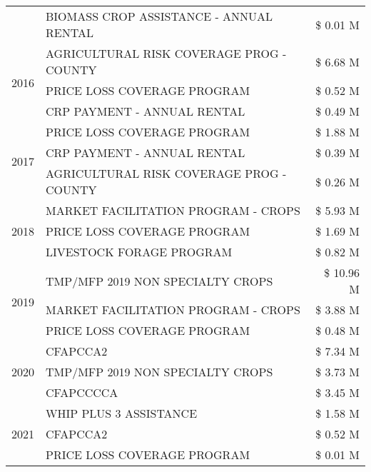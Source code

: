 \begin{tabular}{llr}
 & BIOMASS CROP ASSISTANCE - ANNUAL RENTAL & \$ 0.01 M \\
\cline{1-3}
\multirow[t]{3}{*}{2016} & AGRICULTURAL RISK COVERAGE PROG - COUNTY & \$ 6.68 M \\
 & PRICE LOSS COVERAGE PROGRAM & \$ 0.52 M \\
 & CRP PAYMENT - ANNUAL RENTAL & \$ 0.49 M \\
\cline{1-3}
\multirow[t]{3}{*}{2017} & PRICE LOSS COVERAGE PROGRAM & \$ 1.88 M \\
 & CRP PAYMENT - ANNUAL RENTAL & \$ 0.39 M \\
 & AGRICULTURAL RISK COVERAGE PROG - COUNTY & \$ 0.26 M \\
\cline{1-3}
\multirow[t]{3}{*}{2018} & MARKET FACILITATION PROGRAM - CROPS & \$ 5.93 M \\
 & PRICE LOSS COVERAGE PROGRAM & \$ 1.69 M \\
 & LIVESTOCK FORAGE PROGRAM & \$ 0.82 M \\
\cline{1-3}
\multirow[t]{3}{*}{2019} & TMP/MFP 2019 NON SPECIALTY CROPS & \$ 10.96 M \\
 & MARKET FACILITATION PROGRAM - CROPS & \$ 3.88 M \\
 & PRICE LOSS COVERAGE PROGRAM & \$ 0.48 M \\
\cline{1-3}
\multirow[t]{3}{*}{2020} & CFAPCCA2 & \$ 7.34 M \\
 & TMP/MFP 2019 NON SPECIALTY CROPS & \$ 3.73 M \\
 & CFAPCCCCA & \$ 3.45 M \\
\cline{1-3}
\multirow[t]{3}{*}{2021} & WHIP PLUS 3 ASSISTANCE & \$ 1.58 M \\
 & CFAPCCA2 & \$ 0.52 M \\
 & PRICE LOSS COVERAGE PROGRAM & \$ 0.01 M \\
\cline{1-3}
\bottomrule
\end{tabular}

